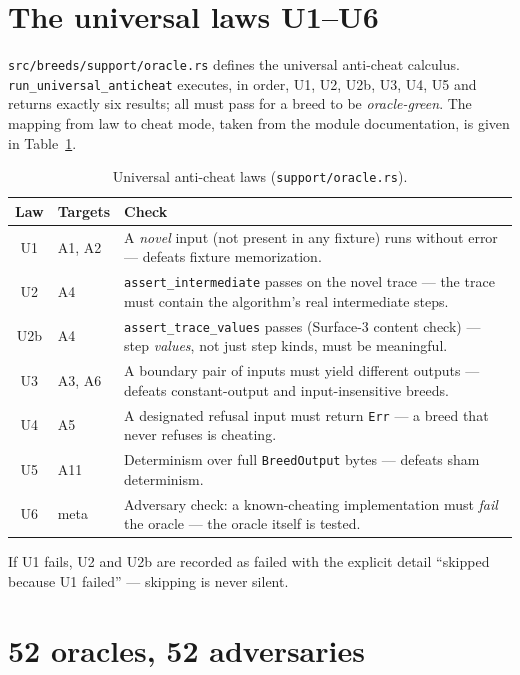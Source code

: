 \documentclass[11pt,oneside]{report}
\begin{document}
\section{The universal laws U1--U6}

\texttt{src/breeds/support/oracle.rs} defines the universal anti-cheat
calculus. \texttt{run\_universal\_anticheat} executes, in order, U1, U2,
U2b, U3, U4, U5 and returns exactly six results; all must pass for a breed
to be \emph{oracle-green}. The mapping from law to cheat mode, taken from
the module documentation, is given in Table~\ref{tab:ulaws}.

\begin{table}[ht]
\centering
\caption{Universal anti-cheat laws (\texttt{support/oracle.rs}).}
\label{tab:ulaws}
\begin{tabular}{clp{7.6cm}}
\toprule
Law & Targets & Check \\
\midrule
U1 & A1, A2 & A \emph{novel} input (not present in any fixture) runs without error --- defeats fixture memorization. \\
U2 & A4 & \texttt{assert\_intermediate} passes on the novel trace --- the trace must contain the algorithm's real intermediate steps. \\
U2b & A4 & \texttt{assert\_trace\_values} passes (Surface-3 content check) --- step \emph{values}, not just step kinds, must be meaningful. \\
U3 & A3, A6 & A boundary pair of inputs must yield different outputs --- defeats constant-output and input-insensitive breeds. \\
U4 & A5 & A designated refusal input must return \texttt{Err} --- a breed that never refuses is cheating. \\
U5 & A11 & Determinism over full \texttt{BreedOutput} bytes --- defeats sham determinism. \\
U6 & meta & Adversary check: a known-cheating implementation must \emph{fail} the oracle --- the oracle itself is tested. \\
\bottomrule
\end{tabular}
\end{table}

If U1 fails, U2 and U2b are recorded as failed with the explicit detail
``skipped because U1 failed'' --- skipping is never silent.

\section{52 oracles, 52 adversaries}
\end{document}
